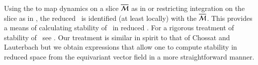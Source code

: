 


Using the {\mframes} to map dynamics on a slice $\overline{\cal M}$
as in  or restricting
integration on the slice as in ,
the reduced \statesp\ is
identified (at least locally) with the {\slice}
${\overline{\cal M}}$. This provides a means of calculating stability
of \reqva\ in reduced \statesp. For a 
rigorous treatment of stability of \reqva\ see .
Our treatment is similar in spirit 
to that of Chossat and Lauterbach but we obtain
expressions that allow one to compute stability in reduced space
from the equivariant vector field in a more straightforward manner.


